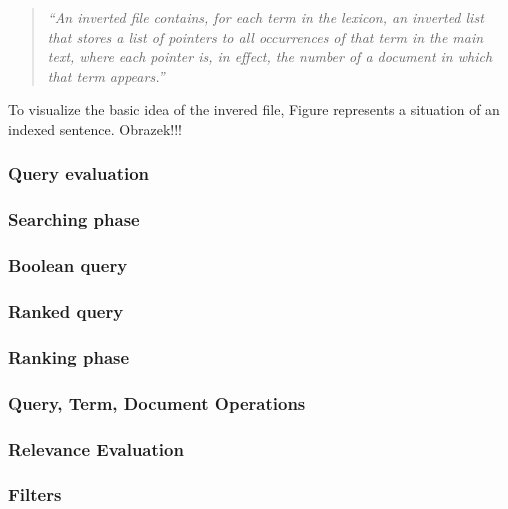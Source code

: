 \begin{quote}
		\textsl{``An inverted file contains, for each term in the lexicon, an inverted list that stores a list of pointers to all occurrences of that term in the main text, where each pointer is, in effect, the number of a document in which that term appears.''}
	\end{quote}
	
	To visualize the basic idea of the invered file, Figure  represents a situation of an indexed sentence.
	Obrazek!!!
	
\subsubsection{Query evaluation}

\subsubsection{Searching phase}


\subsubsection*{Boolean query}

\subsubsection*{Ranked query}


\subsubsection{Ranking phase}	


\subsubsection*{Query, Term, Document Operations}

\subsubsection*{Relevance Evaluation}

\subsubsection*{Filters}



